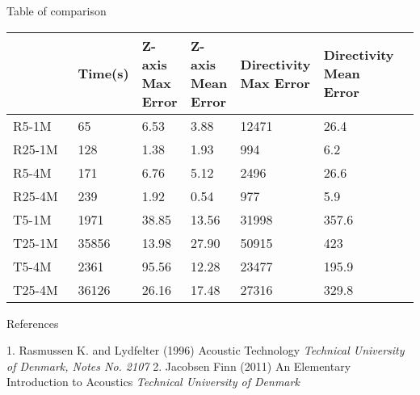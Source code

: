 \documentclass{beamer}
\begin{document}
\begin{frame}{Table of comparison}

\begin{tabularx}{11.30cm}{m{1.5cm}| m{1.2cm}|m{1.5cm}|m{1.5cm}|m{1.5cm} |m{1.5cm}m{1.5cm}}


\ \ \ \ \ \ \ & \scriptsize{Time(s)}  & \scriptsize{Z-axis Max Error} & \scriptsize{Z-axis Mean Error}& \scriptsize{Directivity Max Error}& \scriptsize{Directivity Mean Error}\\
\hline
\scriptsize{R5-1M} & 65 & 6.53 & 3.88 & 12471 & 26.4\\
\scriptsize{R25-1M} & 128 & 1.38 & 1.93 & 994 & 6.2\\
\scriptsize{R5-4M} & 171 & 6.76 & 5.12 & 2496 & 26.6\\
\scriptsize{R25-4M} & 239 & 1.92 & 0.54 & 977 & 5.9\\
\scriptsize{T5-1M} & 1971 & 38.85 & 13.56 & 31998 & 357.6\\
\scriptsize{T25-1M} & 35856 & 13.98 & 27.90 & 50915 & 423\\
\scriptsize{T5-4M} & 2361 & 95.56 & 12.28 & 23477 & 195.9\\
\scriptsize{T25-4M} & 36126 & 26.16 & 17.48 & 27316 & 329.8\\


\end{tabularx}

\end{frame}

\begin{frame}{References}
\begin{thebibliography}{99} %
 1. Rasmussen K. and Lydfelter (1996)
\newblock Acoustic Technology
\newblock \emph{Technical University of Denmark, Notes No. 2107}
 2. Jacobsen Finn (2011)
\newblock An Elementary Introduction to Acoustics
\newblock \emph{Technical University of Denmark}
\end{thebibliography}
\end{frame}
\end{document}
